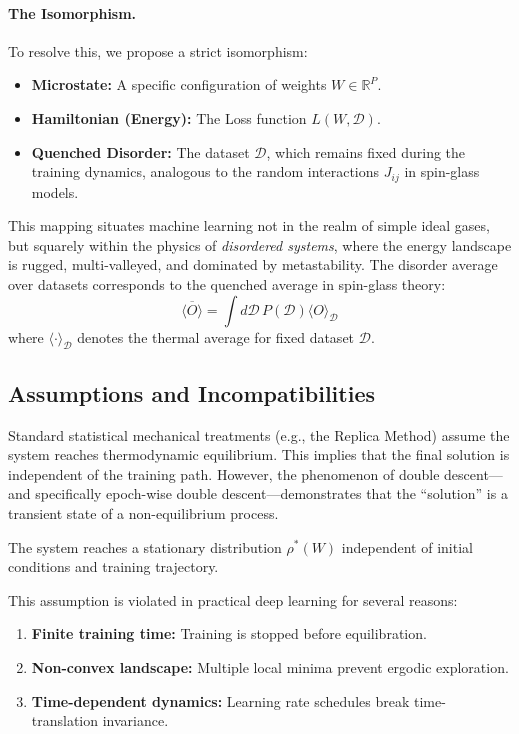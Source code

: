 \documentclass[
  journal=largetwo,
  year=2025,
  volume=37,
]{cup-journal}
\begin{document}
\paragraph{The Isomorphism.} To resolve this, we propose a strict isomorphism:
\begin{itemize}
    \item \textbf{Microstate:} A specific configuration of weights $W \in \mathbb{R}^P$.
    \item \textbf{Hamiltonian (Energy):} The Loss function $L(W, \mathcal{D})$.
    \item \textbf{Quenched Disorder:} The dataset $\mathcal{D}$, which remains fixed during the training dynamics, analogous to the random interactions $J_{ij}$ in spin-glass models.
\end{itemize}

This mapping situates machine learning not in the realm of simple ideal gases, but squarely within the physics of \textit{disordered systems}, where the energy landscape is rugged, multi-valleyed, and dominated by metastability. The disorder average over datasets corresponds to the quenched average in spin-glass theory:
\begin{equation}
    \overline{\langle O \rangle} = \int d\mathcal{D} \, P(\mathcal{D}) \langle O \rangle_{\mathcal{D}}
\end{equation}
where $\langle \cdot \rangle_{\mathcal{D}}$ denotes the thermal average for fixed dataset $\mathcal{D}$.

\subsection{Assumptions and Incompatibilities}

Standard statistical mechanical treatments (e.g., the Replica Method) assume the system reaches thermodynamic equilibrium. This implies that the final solution is independent of the training path. However, the phenomenon of double descent---and specifically epoch-wise double descent---demonstrates that the ``solution'' is a transient state of a non-equilibrium process. 

\begin{assumption}
The system reaches a stationary distribution $\rho^*(W)$ independent of initial conditions and training trajectory.
\end{assumption}

This assumption is violated in practical deep learning for several reasons:
\begin{enumerate}
    \item \textbf{Finite training time:} Training is stopped before equilibration.
    \item \textbf{Non-convex landscape:} Multiple local minima prevent ergodic exploration.
    \item \textbf{Time-dependent dynamics:} Learning rate schedules break time-translation invariance.
\end{enumerate}
\end{document}
